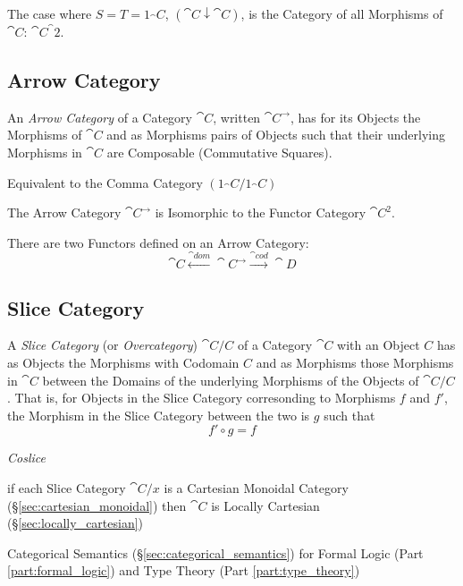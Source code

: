 The case where $S = T = 1_\cat{C}$, $(\cat{C} \downarrow
\cat{C})$, is the Category of all Morphisms of $\cat{C}$:
$\cat{C}^\cat{2}$.



\subsection{Arrow Category}\label{sec:arrow_category}

An \emph{Arrow Category} of a Category $\cat{C}$, written
$\cat{C^{\rightarrow}}$, has for its Objects the Morphisms of
$\cat{C}$ and as Morphisms pairs of Objects such that their
underlying Morphisms in $\cat{C}$ are Composable (Commutative
Squares).

Equivalent to the Comma Category $(1_\cat{C}/1_\cat{C})$

The Arrow Category $\cat{C}^\rightarrow$ is Isomorphic to the
Functor Category $\cat{C^2}$.

There are two Functors defined on an Arrow Category:
\[
  \cat{C} \xleftarrow{\cat{dom}} \cat{C}^\rightarrow
  \xrightarrow{\cat{cod}} \cat{D}
\]



\subsection{Slice Category}\label{sec:slice_category}

A \emph{Slice Category} (or \emph{Overcategory}) $\cat{C}/C$ of a
Category $\cat{C}$ with an Object $C$ has as Objects the Morphisms
with Codomain $C$ and as Morphisms those Morphisms in $\cat{C}$
between the Domains of the underlying Morphisms of the Objects of
$\cat{C}/C$. That is, for Objects in the Slice Category corresonding
to Morphisms $f$ and $f'$, the Morphism in the Slice Category between
the two is $g$ such that
\[
  f' \circ g = f
\]

\emph{Coslice}

if each Slice Category $\cat{C}/x$ is a Cartesian Monoidal Category
(\S\ref{sec:cartesian_monoidal}) then $\cat{C}$ is Locally Cartesian
(\S\ref{sec:locally_cartesian})

Categorical Semantics (\S\ref{sec:categorical_semantics}) for Formal
Logic (Part \ref{part:formal_logic}) and Type Theory (Part
\ref{part:type_theory})



